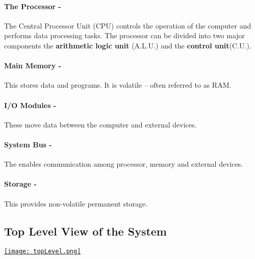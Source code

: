 \documentclass[10pt,a4paper,openany]{book}
\begin{document}
    \paragraph*{The Processor -}
    The Central Processor Unit (CPU) controls the operation of the computer and performs data processing tasks. The processor can be divided into two major components the \textbf{arithmetic logic unit} (A.L.U.) and the \textbf{control unit}(C.U.).

    \paragraph*{Main Memory -}
    This stores data and programs. It is volatile – often referred to as RAM.

    \paragraph*{I/O Modules -}
    These move data between the computer and external devices.

    \paragraph*{System Bus -}
    The enables communication among processor, memory and external devices.

    \paragraph*{Storage -}
    This provides non-volatile permanent storage.

    \subsection{Top Level View of the System}
    \href{http://voer.edu.vn/file/11893}{\texttt{[image: topLevel.png]}}
\end{document}
